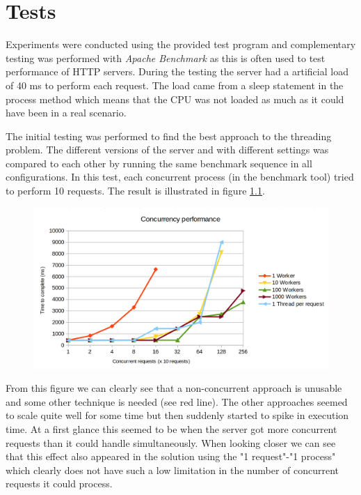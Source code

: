 \chapter{Tests}
Experiments were conducted using the provided test program and complementary testing was performed with \textit{Apache Benchmark} as this is often used to test performance of HTTP servers. During the testing the server had a artificial load of 40 ms to perform each request. The load came from a sleep statement in the process method which means that the CPU was not loaded as much as it could have been in a real scenario.

The initial testing was performed to find the best approach to the threading problem. The different versions of the server and with different settings was compared to each other by running the same benchmark sequence in all configurations. In this test, each concurrent process (in the benchmark tool) tried to perform 10 requests. The result is illustrated in figure \ref{fig:performance-compare}.

\begin{figure}[h]
\centering
\includegraphics[width=0.87\linewidth]{res/performance-compare}
\caption[Comparison between different threading approaches]{}
\label{fig:performance-compare}
\end{figure}

From this figure we can clearly see that a non-concurrent approach is unusable and some other technique is needed (see red line). The other approaches seemed to scale quite well for some time but then suddenly started to spike in execution time. At a first glance this seemed to be when the server got more concurrent requests than it could handle simultaneously. When looking closer we can see that this effect also appeared in the solution using the "1 request"-"1 process" which clearly does not have such a low limitation in the number of concurrent requests it could process.

